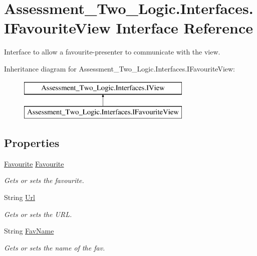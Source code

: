\hypertarget{interface_assessment___two___logic_1_1_interfaces_1_1_i_favourite_view}{
\section{Assessment\_\-Two\_\-Logic.Interfaces.IFavouriteView Interface Reference}
\label{interface_assessment___two___logic_1_1_interfaces_1_1_i_favourite_view}
}


Interface to allow a favourite-\/presenter to communicate with the view.  


Inheritance diagram for Assessment\_\-Two\_\-Logic.Interfaces.IFavouriteView:\begin{figure}[H]
\begin{center}
\leavevmode
\includegraphics[height=2.000000cm]{interface_assessment___two___logic_1_1_interfaces_1_1_i_favourite_view}
\end{center}
\end{figure}
\subsection*{Properties}
\begin{DoxyCompactItemize}
\item 
\hyperlink{class_assessment___two___logic_1_1_model_1_1_favourite}{Favourite} \hyperlink{interface_assessment___two___logic_1_1_interfaces_1_1_i_favourite_view_a1513304311c1bde9c6172dc7863b227b}{Favourite}
\begin{DoxyCompactList}\small\item\em Gets or sets the favourite. \item\end{DoxyCompactList}\item 
String \hyperlink{interface_assessment___two___logic_1_1_interfaces_1_1_i_favourite_view_ae694f9d5e9bfa139bc18368390fd05de}{Url}
\begin{DoxyCompactList}\small\item\em Gets or sets the URL. \item\end{DoxyCompactList}\item 
String \hyperlink{interface_assessment___two___logic_1_1_interfaces_1_1_i_favourite_view_afe418d8504ff1fc0979b923bfc3bc90f}{FavName}
\begin{DoxyCompactList}\small\item\em Gets or sets the name of the fav. \item\end{DoxyCompactList}\end{DoxyCompactItemize}


